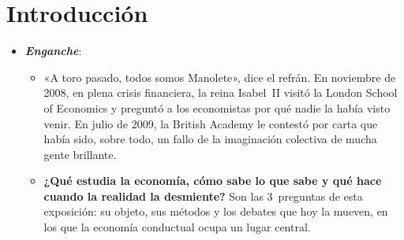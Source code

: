 \documentclass[11pt]{article}
\begin{document}
\tceetitulo

\section*{Introducción}

\begin{itemize}
\item \textbf{\emph{Enganche}}:
  \begin{itemize}
  \item «A toro pasado, todos somos Manolete», dice el refrán. En noviembre de 2008, en plena crisis financiera, la reina Isabel~II visitó la London School of Economics y preguntó a los economistas por qué nadie la había visto venir. En julio de 2009, la British Academy le contestó por carta que había sido, sobre todo, un fallo de la imaginación colectiva de mucha gente brillante\nocite{BesleyHennessy2009Letter}.
  \item \textbf{¿Qué estudia la economía, cómo sabe lo que sabe y qué hace cuando la realidad la desmiente?} Son las 3~preguntas de esta exposición: su objeto, sus métodos y los debates que hoy la mueven, en los que la economía conductual ocupa un lugar central.
  \end{itemize}


\end{itemize}
\end{document}
